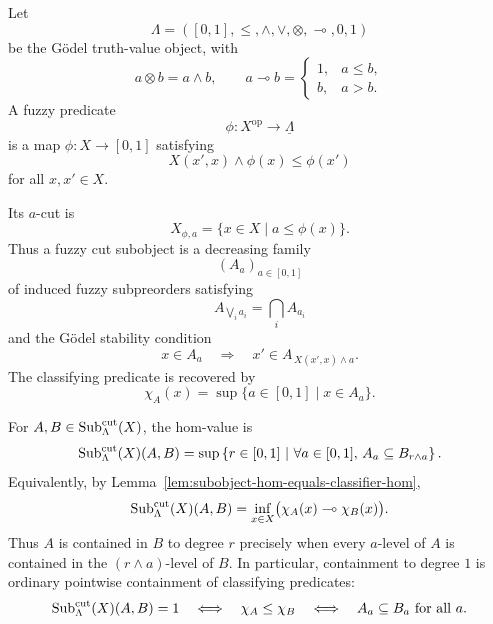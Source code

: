 \begin{example}
\label{ex:cut-subobjects-godel}
    Let
    \[
        \Lambda=([0,1],\leq,\wedge,\vee,\otimes,\multimap,0,1)
    \]
    be the G\"odel truth-value object, with
    \[
        a\otimes b=a\wedge b,
        \qquad
        a\multimap b=
        \begin{cases}
            1, & a\leq b,\\
            b, & a>b.
        \end{cases}
    \]
    A fuzzy predicate
    \[
        \phi:X^{\mathrm{op}}\to\underline{\Lambda}
    \]
    is a map \(\phi:X\to[0,1]\) satisfying
    \[
        X(x',x)\wedge \phi(x)\leq \phi(x')
    \]
    for all \(x,x'\in X\).

    Its \(a\)-cut is
    \[
        X_{\phi,a}
        =
        \{x\in X\mid a\leq \phi(x)\}.
    \]
    Thus a fuzzy cut subobject is a decreasing family
    \[
        (A_a)_{a\in[0,1]}
    \]
    of induced fuzzy subpreorders satisfying
    \[
        A_{\bigvee_i a_i}=\bigcap_i A_{a_i}
    \]
    and the G\"odel stability condition
    \[
        x\in A_a
        \quad\Longrightarrow\quad
        x'\in A_{\,X(x',x)\wedge a}.
    \]
    The classifying predicate is recovered by
    \[
        \chi_A(x)=\sup\{a\in[0,1]\mid x\in A_a\}.
    \]

    For \(A,B\in\mathrm{Sub}^{\mathrm{cut}}_\Lambda(X)\), the hom-value is
    \[
        \mathrm{Sub}^{\mathrm{cut}}_\Lambda(X)(A,B)
        =
        \sup
        \left\{
            r\in[0,1]
            \ \middle|\
            \forall a\in[0,1],\,
            A_a\subseteq B_{r\wedge a}
        \right\}.
    \]
    Equivalently, by Lemma~\ref{lem:subobject-hom-equals-classifier-hom},
    \[
        \mathrm{Sub}^{\mathrm{cut}}_\Lambda(X)(A,B)
        =
        \inf_{x\in X}
        \bigl(\chi_A(x)\multimap\chi_B(x)\bigr).
    \]
    Thus \(A\) is contained in \(B\) to degree \(r\) precisely when every \(a\)-level of \(A\) is contained in the \((r\wedge a)\)-level of \(B\). In particular, containment to degree \(1\) is ordinary pointwise containment of classifying predicates:
    \[
        \mathrm{Sub}^{\mathrm{cut}}_\Lambda(X)(A,B)=1
        \quad\Longleftrightarrow\quad
        \chi_A\leq\chi_B
        \quad\Longleftrightarrow\quad
        A_a\subseteq B_a
        \text{ for all }a.
    \]
\end{example}

